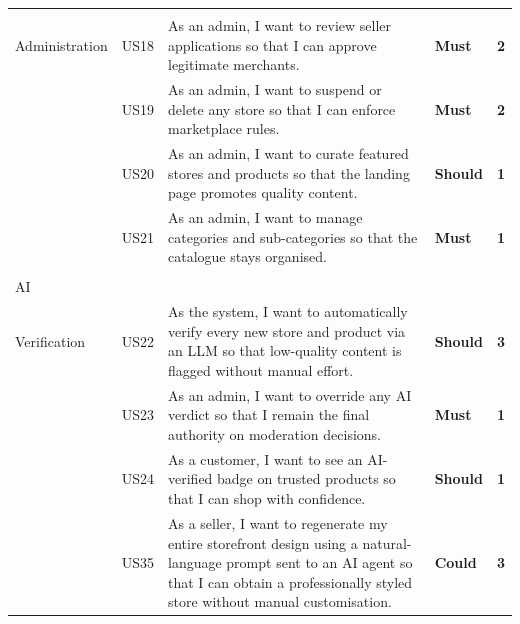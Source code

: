 \documentclass[12pt, a4paper, oneside]{report}
\begin{document}
\begin{longtable}{|>{\centering\arraybackslash\small}p{2.2cm}|>{\centering\arraybackslash\small}p{0.9cm}|>{\small}p{7.6cm}|>{\centering\arraybackslash\small}p{1.4cm}|>{\centering\arraybackslash\small}p{0.7cm}|}
  \cellcolor{featAdmin}\makecell[c]{\textbf{F5}\\\small Administration}
  & US18 & As an admin, I want to review seller applications so that I can approve legitimate merchants.
  & \cellcolor{moscowMust}\textbf{Must} & \cellcolor{complexMed}\textbf{2} \\\hline
  \cellcolor{featAdmin}~
  & US19 & As an admin, I want to suspend or delete any store so that I can enforce marketplace rules.
  & \cellcolor{moscowMust}\textbf{Must} & \cellcolor{complexMed}\textbf{2} \\\hline
  \cellcolor{featAdmin}~
  & US20 & As an admin, I want to curate featured stores and products so that the landing page promotes quality content.
  & \cellcolor{moscowShould}\textbf{Should} & \cellcolor{complexLow}\textbf{1} \\\hline
  \cellcolor{featAdmin}~
  & US21 & As an admin, I want to manage categories and sub-categories so that the catalogue stays organised.
  & \cellcolor{moscowMust}\textbf{Must} & \cellcolor{complexLow}\textbf{1} \\\hline

  \cellcolor{featAI}\makecell[c]{\textbf{F6}\\\small AI\\Verification}
  & US22 & As the system, I want to automatically verify every new store and product via an LLM so that low-quality content is flagged without manual effort.
  & \cellcolor{moscowShould}\textbf{Should} & \cellcolor{complexHigh}\textbf{3} \\\hline
  \cellcolor{featAI}~
  & US23 & As an admin, I want to override any AI verdict so that I remain the final authority on moderation decisions.
  & \cellcolor{moscowMust}\textbf{Must} & \cellcolor{complexLow}\textbf{1} \\\hline
  \cellcolor{featAI}~
  & US24 & As a customer, I want to see an AI-verified badge on trusted products so that I can shop with confidence.
  & \cellcolor{moscowShould}\textbf{Should} & \cellcolor{complexLow}\textbf{1} \\\hline
  \cellcolor{featAI}~
  & US35 & As a seller, I want to regenerate my entire storefront design using a natural-language prompt sent to an AI agent so that I can obtain a professionally styled store without manual customisation.
  & \cellcolor{moscowCould}\textbf{Could} & \cellcolor{complexHigh}\textbf{3} \\\hline


\end{longtable}
\end{document}
